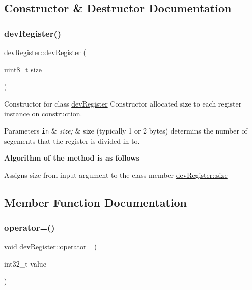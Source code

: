 \subsection{Constructor \& Destructor Documentation}
\mbox{\label{classdev_register_a17ac6e4e1ee9a2395e94e0a3c1000caa}} 
\subsubsection{\texorpdfstring{dev\+Register()}{devRegister()}}
{\footnotesize\ttfamily dev\+Register\+::dev\+Register (\begin{DoxyParamCaption}\item[{uint8\+\_\+t}]{size }\end{DoxyParamCaption})}



Constructor for class \mbox{\hyperlink{classdev_register}{dev\+Register}} Constructor allocated size to each register instance on construction. 


\begin{DoxyParams}[1]{Parameters}
\mbox{\tt in}  & {\em size;} & size (typically 1 or 2 bytes) determins the number of segements that the register is divided in to. \\
\hline
\end{DoxyParams}
{\bfseries Algorithm of the method is as follows}


\begin{DoxyItemize}
\item Assigns size from input argument to the class member \mbox{\hyperlink{classdev_register_a6596e86ccbcd857febb5c28bc03aa480}{dev\+Register\+::size}} 
\end{DoxyItemize}

\subsection{Member Function Documentation}
\mbox{\label{classdev_register_a944b194a7335c6b0a9f9f3c1ffc12c97}} 
\subsubsection{\texorpdfstring{operator=()}{operator=()}}
{\footnotesize\ttfamily void dev\+Register\+::operator= (\begin{DoxyParamCaption}\item[{int32\+\_\+t}]{value }\end{DoxyParamCaption})}




